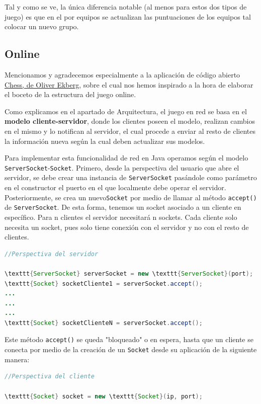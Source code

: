 \documentclass[../DocumentoOficial.tex]{subfiles}
\begin{document}
Tal y como se ve, la única diferencia notable (al menos para estos dos tipos de juego) es que en el por equipos se actualizan las puntuaciones de los equipos tal colocar un nuevo grupo.

\newpage

\subsection{Online}

Mencionamos y agradecemos especialmente a la aplicación de código abierto \href{https://github.com/OliverEkberg/Chess}{Chess, de Oliver Ekberg}, sobre el cual nos hemos inspirado a la hora de elaborar el boceto de la estructura del juego online.

Como explicamos en el apartado de Arquitectura, el juego en red se basa en el \textbf{modelo cliente-servidor}, donde los clientes poseen el modelo, realizan cambios en el mismo y lo notifican al servidor, el cual procede a enviar al resto de clientes la información nueva según la cual deben actualizar sus modelos.

Para implementar esta funcionalidad de red en Java operamos según el modelo \texttt{ServerSocket}-\texttt{Socket}. Primero, desde la perspectiva del usuario que abre el servidor, se debe crear una instancia de \texttt{ServerSocket} pasándole como parámetro en el constructor el puerto en el que localmente debe operar el servidor. Posteriormente, se crea un nuevo\texttt{Socket} por medio de llamar al método \texttt{accept()} de \texttt{ServerSocket}. De esta forma, tenemos un socket asociado a un cliente en específico. Para n clientes el servidor necesitará n sockets. Cada cliente solo necesita un socket, pues solo tiene conexión con el servidor y no con el resto de clientes.

\begin{lstlisting}[frame=single, language=Java]
//Perspectiva del servidor

\texttt{ServerSocket} serverSocket = new \texttt{ServerSocket}(port);
\texttt{Socket} socketCliente1 = serverSocket.accept();
...
...
...
\texttt{Socket} socketClienteN = serverSocket.accept();

\end{lstlisting}


Este método \texttt{accept()} se queda "bloqueado" o en espera, hasta que un cliente se conecta por medio de la creación de un \texttt{Socket} desde su aplicación de la siguiente manera:

\begin{lstlisting}[frame=single, language=Java]
//Perspectiva del cliente

\texttt{Socket} socket = new \texttt{Socket}(ip, port);

\end{lstlisting}
\end{document}
